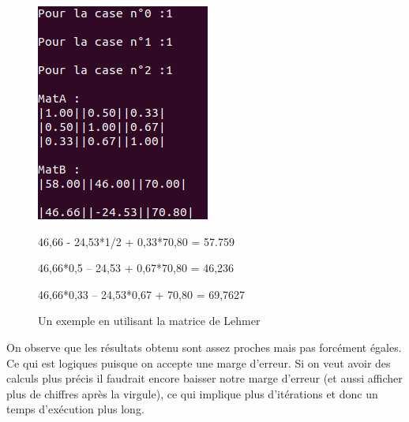 \documentclass[12pt]{article}
\begin{document}
\begin{figure}[H]
  \begin{minipage}{0.4\textwidth}
    \centering
    \includegraphics[width=1\linewidth]{./img/GSPreuveAlea}
    \caption{Un exemple en utilisant la matrice de Lehmer}\label{Img_GSPreuveAlea}
  \end{minipage}\hfill
  \begin{minipage}{0.5\textwidth}
    
    46,66 - 24,53*1/2 + 0,33*70,80 = 57.759
    
    46,66*0,5 – 24,53 + 0,67*70,80 = 46,236
    
    46,66*0,33 – 24,53*0,67 + 70,80 = 69,7627
 
  \end{minipage}
\end{figure}

 On observe que les résultats obtenu sont assez proches mais pas forcément égales. Ce qui est logiques puisque on accepte une marge d'erreur. Si on veut avoir des calculs plus précis il faudrait encore baisser notre marge d'erreur (et aussi afficher plus de chiffres après la virgule), ce qui implique plus d'itérations et donc un temps d'exécution plus long.
        
\end{document}
